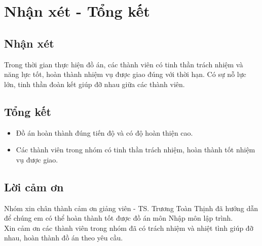 \section{Nhận xét - Tổng kết}
\subsection{Nhận xét}
Trong thời gian thực hiện đồ án, các thành viên có tinh thần trách nhiệm và năng lực tốt, hoàn thành nhiệm vụ được giao đúng với thời hạn. Có sự nỗ lực lớn, tinh thần đoàn kết giúp đỡ nhau giữa các thành viên.
\subsection{Tổng kết}
\begin{itemize}
    \item Đồ án hoàn thành đúng tiến độ và có độ hoàn thiện cao.
    \item Các thành viên trong nhóm có tinh thần trách nhiệm, hoàn thành tốt nhiệm vụ được giao.
\end{itemize}
\subsection{Lời cảm ơn}
Nhóm xin chân thành cảm ơn giảng viên - TS. Trương Toàn Thịnh đã hướng dẫn để chúng em có thể hoàn thành tốt được đồ án môn Nhập môn lập trình.\\

Xin cảm ơn các thành viên trong nhóm đã có trách nhiệm và nhiệt tình giúp đỡ nhau, hoàn thành đồ án theo yêu cầu.


